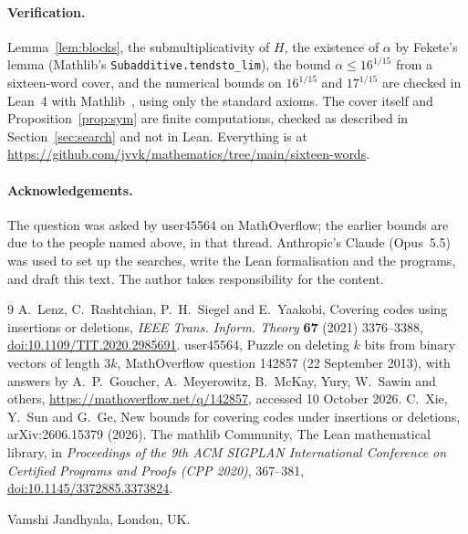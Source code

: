 \documentclass[11pt]{article}
\theoremstyle{remark}
\begin{document}
\paragraph{Verification.} Lemma~\ref{lem:blocks}, the submultiplicativity of $H$, the existence of $\alpha$
by Fekete's lemma (Mathlib's \texttt{Subadditive.tendsto\_lim}), the bound $\alpha\le16^{1/15}$ from a
sixteen-word cover, and the numerical bounds on $16^{1/15}$ and $17^{1/15}$ are checked in Lean~4 with
Mathlib~\cite{mathlib}, using only the standard axioms. The cover itself and Proposition~\ref{prop:sym} are
finite computations, checked as described in Section~\ref{sec:search} and not in Lean. Everything is at
\url{https://github.com/jvvk/mathematics/tree/main/sixteen-words}.

\paragraph{Acknowledgements.} The question was asked by user45564 on MathOverflow; the earlier bounds are
due to the people named above, in that thread. Anthropic's Claude (Opus~5.5) was used to set up the searches,
write the Lean formalisation and the programs, and draft this text. The author takes responsibility for the
content.

\begin{thebibliography}{9}
 A.~Lenz, C.~Rashtchian, P.~H.~Siegel and E.~Yaakobi, Covering codes using insertions or
deletions, \emph{IEEE Trans. Inform. Theory} \textbf{67} (2021) 3376--3388,
\href{https://doi.org/10.1109/TIT.2020.2985691}{doi:10.1109/TIT.2020.2985691}.
 user45564, Puzzle on deleting $k$ bits from binary vectors of length $3k$, MathOverflow
question 142857 (22 September 2013), with answers by A.~P.~Goucher, A.~Meyerowitz, B.~McKay, Yury,
W.~Sawin and others, \url{https://mathoverflow.net/q/142857}, accessed 10 October 2026.
 C.~Xie, Y.~Sun and G.~Ge, New bounds for covering codes under insertions or deletions,
arXiv:2606.15379 (2026).
 The mathlib Community, The Lean mathematical library, in \emph{Proceedings of the 9th ACM
SIGPLAN International Conference on Certified Programs and Proofs (CPP 2020)}, 367--381,
\href{https://doi.org/10.1145/3372885.3373824}{doi:10.1145/3372885.3373824}.
\end{thebibliography}

\bigskip
\noindent Vamshi Jandhyala, London, UK.
\end{document}
